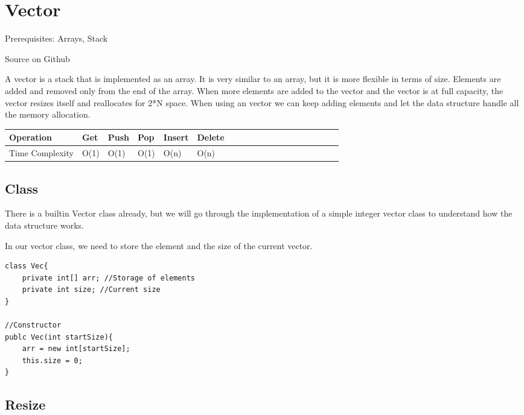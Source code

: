 \documentclass[11pt,oneside]{book}
\begin{document}
        \section{ Vector }
        

Prerequisites: Arrays, Stack

Source on Github

A vector is a stack that is implemented as an array. It is very similar to an array, but it is more flexible in terms of size. Elements are added and removed only from the end of the array. When more elements are added to the vector and the vector is at full capacity, the vector resizes itself and reallocates for 2*N space. When using an vector we can keep adding elements and let the data structure handle all the memory allocation.

\vspace{10pt} \begin{tabulary}{0.4\linewidth}{|l|l|l|l|l|l|l|l|l|l|l|l|l|l|l|l|l|l|l}\hline


  Operation &
  Get &
  Push &
  Pop &
  Insert &
  Delete\\
\hline


  Time Complexity &
  O(1) &
  O(1) &
  O(1) &
  O(n) &
  O(n)\\

\hline\end{tabulary}

\subsection{Class}

There is a builtin Vector class already, but we will go through the implementation of a simple integer vector class to understand how the data structure works.

In our vector class, we need to store the element and the size of the current vector.

\begin{lstlisting}
class Vec{
    private int[] arr; //Storage of elements
    private int size; //Current size
}

//Constructor
publc Vec(int startSize){
    arr = new int[startSize];
    this.size = 0;
}

\end{lstlisting}

\subsection{Resize}
\end{document}
